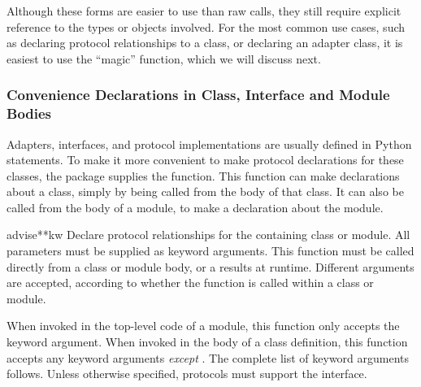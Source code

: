 \begin{verbatim%
}
\begin{verbatim%
}
\begin{verbatim%
}
\begin{verbatim%
}
Although these forms are easier to use than raw 
calls, they still require explicit reference to the types or objects involved.
For the most common use cases, such as declaring protocol relationships to a
class, or declaring an adapter class, it is easiest to use the ``magic''
 function, which we will discuss next.




















\subsubsection{Convenience Declarations in Class, Interface and Module Bodies}

Adapters, interfaces, and protocol implementations are usually defined in
Python  statements.  To make it more convenient to make protocol
declarations for these classes, the  package supplies the
 function.  This function  can make declarations about a
class, simply by being called from the body of that class.  It can also be
called from the body of a module, to make a declaration about the module.

\begin{funcdesc}{advise}{**kw}
Declare protocol relationships for the containing class or module.  All
parameters must be supplied as keyword arguments.  This function must be
called directly from a class or module body, or a 
results at runtime.  Different arguments are accepted, according to whether
the function is called within a class or module.

When invoked in the top-level code of a module, this function only accepts
the  keyword argument.  When invoked in the body of a
class definition, this function accepts any keyword arguments \emph{except}
.  The complete list of keyword arguments follows.
Unless otherwise specified, protocols must support the 
interface.

\end{funcdesc}














\end{verbatim%
}
\end{verbatim%
}
\end{verbatim%
}
\end{verbatim%
}
